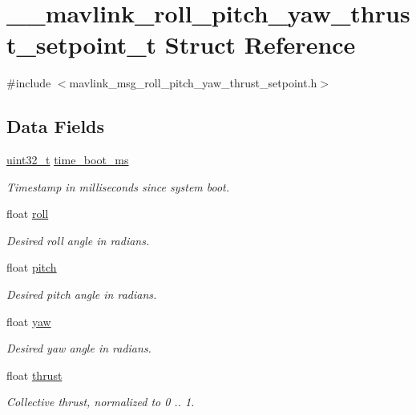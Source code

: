 \hypertarget{struct____mavlink__roll__pitch__yaw__thrust__setpoint__t}{\section{\-\_\-\-\_\-mavlink\-\_\-roll\-\_\-pitch\-\_\-yaw\-\_\-thrust\-\_\-setpoint\-\_\-t Struct Reference}
\label{struct____mavlink__roll__pitch__yaw__thrust__setpoint__t}
}


{\ttfamily \#include $<$mavlink\-\_\-msg\-\_\-roll\-\_\-pitch\-\_\-yaw\-\_\-thrust\-\_\-setpoint.\-h$>$}

\subsection*{Data Fields}
\begin{DoxyCompactItemize}
\item 
\hyperlink{stdint_8h_a435d1572bf3f880d55459d9805097f62}{uint32\-\_\-t} \hyperlink{struct____mavlink__roll__pitch__yaw__thrust__setpoint__t_ae474dbaeb814206cd136f31fdc75a67b}{time\-\_\-boot\-\_\-ms}
\begin{DoxyCompactList}\small\item\em Timestamp in milliseconds since system boot. \end{DoxyCompactList}\item 
float \hyperlink{struct____mavlink__roll__pitch__yaw__thrust__setpoint__t_a8b5fda6cd64d2c127b71f8c6328c1ff3}{roll}
\begin{DoxyCompactList}\small\item\em Desired roll angle in radians. \end{DoxyCompactList}\item 
float \hyperlink{struct____mavlink__roll__pitch__yaw__thrust__setpoint__t_ab78c4ce224140fd9692ca648e8e59a78}{pitch}
\begin{DoxyCompactList}\small\item\em Desired pitch angle in radians. \end{DoxyCompactList}\item 
float \hyperlink{struct____mavlink__roll__pitch__yaw__thrust__setpoint__t_a4004dd45e067bbb256a1e5614d1d3e8a}{yaw}
\begin{DoxyCompactList}\small\item\em Desired yaw angle in radians. \end{DoxyCompactList}\item 
float \hyperlink{struct____mavlink__roll__pitch__yaw__thrust__setpoint__t_a8308ca5218b9c676b545b96689ef0183}{thrust}
\begin{DoxyCompactList}\small\item\em Collective thrust, normalized to 0 .. 1. \end{DoxyCompactList}\end{DoxyCompactItemize}


